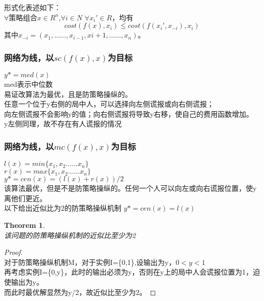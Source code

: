\documentclass[11pt]{ctexart}
\newtheorem{theorem}{Theorem}
\newtheorem{proof}{Proof}[section]
\begin{document}
形式化表述如下：\\
$\forall$策略组合$x \in R^n$,$\forall i \in N$ $\forall x_i' \in R$，均有
$$
cost(f(x),x_i) \leq cost(f(x_i',x_{-i}),x_i)
$$
其中$x_{-i}=(x_1,……,x_{i-1},x{i+1},……,x_n)$。

\subsubsection{网络为线，以$sc(f(x),x)$为目标}
$y*=med(x)$\\
med表示中位数\\

易证改算法为最优，且是防策略操纵的。\\
任意一个位于y右侧的局中人，可以选择向左侧谎报或向右侧谎报；\\
向左侧谎报不会影响y的值；向右侧谎报将导致y右移，使自己的费用函数增加。\\
y左侧同理，故不存在有人谎报的情况\\


\subsubsection{网络为线，以$mc(f(x),x)$为目标}

$l(x)=min\{x_1,x_2……x_n\}$\\
$r(x)=max\{x_1,x_2……x_n\}$\\
$y*=cen(x)=(l(x)+r(x))/2$\\

该算法最优，但是不是防策略操纵的。任何一个人可以向左或向右谎报位置，使y离他们更近。\\

以下给出近似比为2的防策略操纵机制
$y*=cen(x)=l(x)$\\

\begin{theorem}\\
该问题的防策略操纵机制的近似比至少为2
\end{theorem}

\begin{proof}\\
对于防策略操纵机制M，对于实例I=\{0,1\},设输出为y，$0<y<1$\\

再考虑实例I=\{0,y\}，此时的输出必须为y，否则在y上的局中人会谎报位置为1，迫使输出为y。\\

而此时最优解显然为y/2，故近似比至少为2。

\end{proof}
\end{document}
